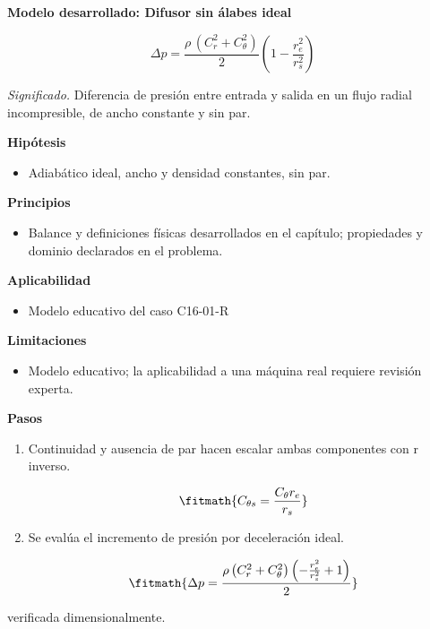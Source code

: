 \documentclass[10pt,openany]{book}
\begin{document}
\begin{tcolorbox}[title={Desarrollos del modelo}, studiumdef, breakable]

\noindent\textbf{Modelo desarrollado: Difusor sin álabes ideal}

\begin{equation}
\Delta p=\frac{\rho\,(C_r^2+C_\theta^2)}{2}\left(1-\frac{r_e^2}{r_s^2}\right)
\label{eq:EC-C16}
\end{equation}

\noindent\textit{Significado.} Diferencia de presión entre entrada y salida en un flujo radial incompresible, de ancho constante y sin par.

\noindent\textbf{Hipótesis}
\begin{itemize}
\item Adiabático ideal, ancho y densidad constantes, sin par.
\end{itemize}

\noindent\textbf{Principios}
\begin{itemize}
\item Balance y definiciones físicas desarrollados en el capítulo; propiedades y dominio declarados en el problema.
\end{itemize}

\noindent\textbf{Aplicabilidad}
\begin{itemize}
\item Modelo educativo del caso C16-01-R
\end{itemize}

\noindent\textbf{Limitaciones}
\begin{itemize}
\item Modelo educativo; la aplicabilidad a una máquina real requiere revisión experta.
\end{itemize}

\noindent\textbf{Pasos}
\begin{enumerate}
\item
Continuidad y ausencia de par hacen escalar ambas componentes con r inverso.

\[
\fitmath{C_{\theta s}=\frac{C_\theta r_e}{r_s}}
\]
\item
Se evalúa el incremento de presión por deceleración ideal.

\[
\fitmath{\Delta p=\frac{\rho \left(C_r^{2} + C_\theta^{2}\right) \left(- \frac{r_e^{2}}{r_s^{2}} + 1\right)}{2}}
\]
\end{enumerate}

{\noindent\footnotesize verificada dimensionalmente.\par}
\end{tcolorbox}
\end{document}
